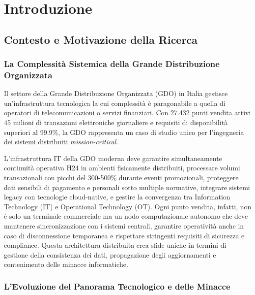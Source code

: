 \chapter{Introduzione}
\label{cap1_introduction}

\section{Contesto e Motivazione della Ricerca}

\subsection{La Complessità Sistemica della Grande Distribuzione Organizzata}

Il settore della Grande Distribuzione Organizzata (GDO) in Italia gestisce un'infrastruttura tecnologica la cui complessità è paragonabile a quella di operatori di telecomunicazioni o servizi finanziari. Con 27.432 punti vendita attivi\autocite{istat2024} 45 milioni di transazioni elettroniche giornaliere e requisiti di disponibilità superiori al 99.9\%, la GDO rappresenta un caso di studio unico per l'ingegneria dei sistemi distribuiti\textit{ mission-critical}.

L'infrastruttura IT della GDO moderna deve garantire simultaneamente continuità operativa H24 in ambienti fisicamente distribuiti, processare volumi transazionali con picchi del 300-500\% durante eventi promozionali\autocite{Osservatorio2024}, proteggere dati sensibili di pagamento e personali sotto multiple normative, integrare sistemi legacy con tecnologie cloud-native, e gestire la convergenza tra Information Technology (IT) e Operational Technology (OT). Ogni punto vendita, infatti, non è solo un terminale commerciale ma un nodo computazionale autonomo che deve mantenere sincronizzazione con i sistemi centrali, garantire operatività anche in caso di disconnessione temporanea e rispettare stringenti requisiti di sicurezza e compliance. Questa architettura distribuita crea sfide uniche in termini di gestione della consistenza dei dati, propagazione degli aggiornamenti e contenimento delle minacce informatiche.

\subsection{L'Evoluzione del Panorama Tecnologico e delle Minacce}

